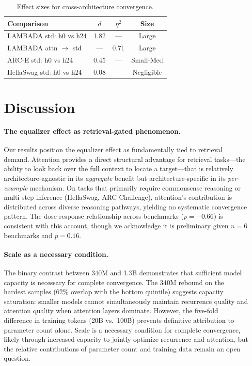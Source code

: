 \documentclass[11pt,a4paper]{article}
\begin{document}
\begin{table}[t]
\centering
\small
\caption{Effect sizes for cross-architecture convergence.}
\label{tab:effect-sizes}
\begin{tabular}{@{}lccc@{}}
\toprule
Comparison & $d$ & $\eta^2$ & Size \\
\midrule
LAMBADA std: h0 vs h24 & 1.82 & --- & Large \\
LAMBADA attn $\to$ std & --- & 0.71 & Large \\
ARC-E std: h0 vs h24 & 0.45 & --- & Small-Med \\
HellaSwag std: h0 vs h24 & 0.08 & --- & Negligible \\
\bottomrule
\end{tabular}
\end{table}

\section{Discussion}

\paragraph{The equalizer effect as retrieval-gated phenomenon.}
Our results position the equalizer effect as fundamentally tied to retrieval demand. Attention provides a direct structural advantage for retrieval tasks---the ability to look back over the full context to locate a target---that is relatively architecture-agnostic in its \emph{aggregate} benefit but architecture-specific in its \emph{per-example} mechanism. On tasks that primarily require commonsense reasoning or multi-step inference (HellaSwag, ARC-Challenge), attention's contribution is distributed across diverse reasoning pathways, yielding no systematic convergence pattern. The dose-response relationship across benchmarks ($\rho{=}{-}0.66$) is consistent with this account, though we acknowledge it is preliminary given $n{=}6$ benchmarks and $p{=}0.16$.

\paragraph{Scale as a necessary condition.}
The binary contrast between 340M and 1.3B demonstrates that sufficient model capacity is necessary for complete convergence. The 340M rebound on the hardest samples (62\% overlap with the bottom quintile) suggests capacity saturation: smaller models cannot simultaneously maintain recurrence quality and attention quality when attention layers dominate. However, the five-fold difference in training tokens (20B vs.\ 100B) prevents definitive attribution to parameter count alone. Scale is a necessary condition for complete convergence, likely through increased capacity to jointly optimize recurrence and attention, but the relative contributions of parameter count and training data remain an open question.
\end{document}
